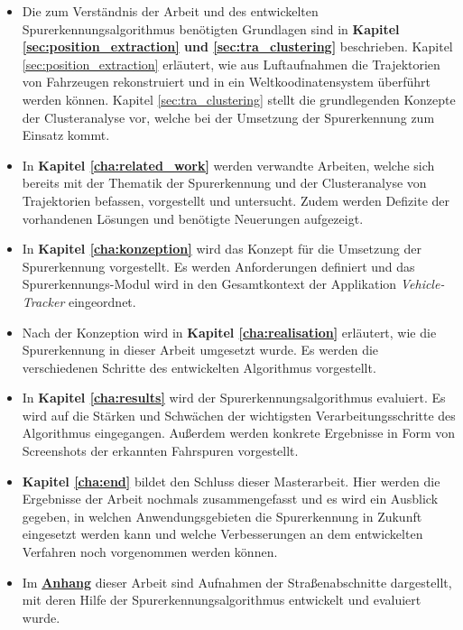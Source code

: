 \begin{itemize}
    \item Die zum Verständnis der Arbeit und des entwickelten Spurerkennungsalgorithmus benötigten
            Grundlagen sind in \textbf{Kapitel \ref{sec:position_extraction} und \ref{sec:tra_clustering}} beschrieben.
            Kapitel \ref{sec:position_extraction} erläutert, wie aus Luftaufnahmen die Trajektorien von Fahrzeugen
            rekonstruiert und in ein Weltkoodinatensystem überführt werden können.
            Kapitel \ref{sec:tra_clustering} stellt die grundlegenden Konzepte der Clusteranalyse vor, welche
            bei der Umsetzung der Spurerkennung zum Einsatz kommt.
    \item In \textbf{Kapitel \ref{cha:related_work}} werden verwandte Arbeiten, welche sich bereits mit
            der Thematik der Spurerkennung und der Clusteranalyse von Trajektorien befassen, vorgestellt und untersucht.
            Zudem werden Defizite der vorhandenen Lösungen und benötigte Neuerungen aufgezeigt.
    \item In \textbf{Kapitel \ref{cha:konzeption}} wird das Konzept für die Umsetzung der Spurerkennung vorgestellt.
            Es werden Anforderungen definiert und das Spurerkennungs-Modul wird in den Gesamtkontext
            der Applikation \textit{Vehicle-Tracker} eingeordnet.
    \item Nach der Konzeption wird in \textbf{Kapitel \ref{cha:realisation}} erläutert, wie die Spurerkennung in dieser Arbeit
            umgesetzt wurde. Es werden die verschiedenen Schritte des entwickelten Algorithmus vorgestellt.
    \item In \textbf{Kapitel \ref{cha:results}} wird der Spurerkennungsalgorithmus evaluiert.
            Es wird auf die Stärken und Schwächen der wichtigsten Verarbeitungsschritte des Algorithmus eingegangen.
            Außerdem werden konkrete Ergebnisse in Form von Screenshots der erkannten Fahrspuren vorgestellt.
    \item \textbf{Kapitel \ref{cha:end}} bildet den Schluss dieser Masterarbeit. Hier werden die Ergebnisse der
            Arbeit nochmals zusammengefasst und es wird ein Ausblick gegeben, in welchen Anwendungsgebieten die Spurerkennung
            in Zukunft eingesetzt werden kann und welche Verbesserungen an dem entwickelten Verfahren noch vorgenommen werden können.
    \item Im \textbf{\hyperref[cha:anhang_a]{Anhang}} dieser Arbeit sind Aufnahmen der Straßenabschnitte dargestellt,
            mit deren Hilfe der Spurerkennungsalgorithmus entwickelt und evaluiert wurde.
\end{itemize}

